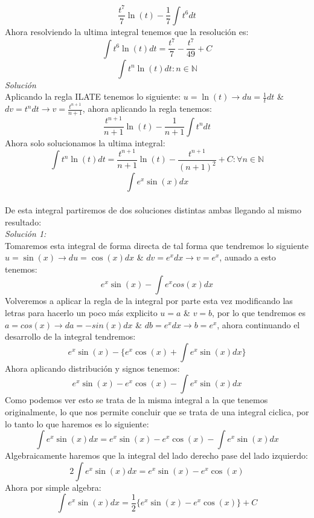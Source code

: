 \documentclass[10pt,executivepaper]{article}
\begin{document}
\[\frac{t^7}{7}\ln(t)-\frac{1}{7}\int t^{6}dt\]
Ahora resolviendo la ultima integral tenemos que la resolución es:\\
\[\int t^{6}\ln(t)dt = \frac{t^{7}}{7}-\frac{t^{7}}{49} + C\]
\vspace{1cm}
\[\int t^{n}\ln(t)dt \colon n \in \mathbb{N}\]
\textit{Solución}\\
Aplicando la regla ILATE tenemos lo siguiente: $u=\ln(t)\rightarrow du=\frac{1}{t}dt$ \& $dv=t^{n}dt \rightarrow v=\frac{t^{n+1}}{n+1}$, ahora aplicando la regla tenemos:\\
\[\frac{t^{n+1}}{n+1}\ln(t)-\frac{1}{n+1}\int t^{n}dt\]
Ahora solo solucionamos la ultima integral:
\[\int t^{n}\ln(t)dt = \frac{t^{n+1}}{n+1}\ln(t)-\frac{t^{n+1}}{(n+1)^{2}} + C \colon \forall n \in \mathbb{N}\]
\vspace{1cm}
\[\int e^{x}\sin(x)dx\]\\
De esta integral partiremos de dos soluciones distintas ambas llegando al mismo resultado:\\
\textit{Solución 1:}\\
Tomaremos esta integral de forma directa de tal forma que tendremos lo siguiente $u=\sin(x)\rightarrow du= \cos(x)dx$ \& $dv=e^{x}dx \rightarrow v=e^{x}$, aunado a esto tenemos:
\[e^{x}\sin(x) - \int e^{x}cos(x)dx \]
Volveremos a aplicar la regla de la integral por parte esta vez modificando las letras para hacerlo un poco más explicito $u=a$ \& $v=b$, por lo que tendremos es $a=cos(x) \rightarrow da=-sin(x)dx$ \& $db=e^{x}dx \rightarrow b=e^{x}$, ahora continuando el desarrollo de la integral tendremos:
\[e^{x}\sin(x)-\{e^{x}\cos(x)+\int e^{x}\sin(x)dx\}\]
Ahora aplicando distribución y signos tenemos:
\[e^{x}\sin(x)-e^{x}\cos(x)-\int e^{x}\sin(x)dx\]
Como podemos ver esto se trata de la misma integral a la que tenemos originalmente, lo que nos permite concluir que se trata de una integral ciclica, por lo tanto lo que haremos es lo siguiente:
\[\int e^{x}\sin(x)dx = e^{x}\sin(x)-e^{x}\cos(x)-\int e^{x}\sin(x)dx\]
Algebraicamente haremos que la integral del lado derecho pase del lado izquierdo:
\[2\int e^{x}\sin(x)dx = e^{x}\sin(x)-e^{x}\cos(x)\]
Ahora por simple algebra:
\[\int e^{x}\sin(x)dx = \frac{1}{2}\{e^{x}\sin(x)-e^{x}\cos(x)\}+C\]
\end{document}
